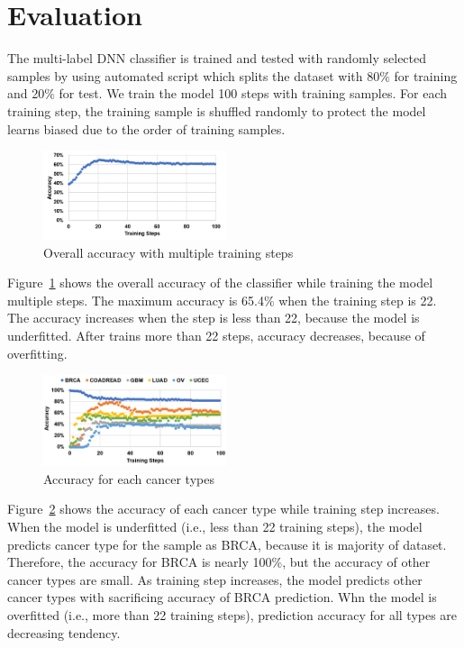 \section{Evaluation}

The multi-label DNN classifier is trained and tested with randomly selected samples by using automated script which splits the dataset with 80\% for training and 20\% for test. We train the model 100 steps with training samples. For each training step, the training sample is shuffled randomly to protect the model learns biased due to the order of training samples.

\begin{figure}[t]
\includegraphics[width=0.48\textwidth]{figs/accuracy_dnn_model.png}
\caption{Overall accuracy with multiple training steps}
\label{fig:accuracy_dnn_model}
\end{figure}

Figure~\ref{fig:accuracy_dnn_model} shows the overall accuracy of the classifier while training the model multiple steps. The maximum accuracy is 65.4\% when the training step is 22. The accuracy increases when the step is less than 22, because the model is underfitted. After trains more than 22 steps, accuracy decreases, because of overfitting.

\begin{figure}[t]
\includegraphics[width=0.48\textwidth]{figs/accuracy_dnn_cancer.png}
\caption{Accuracy for each cancer types}
\label{fig:accuracy_dnn_cancer}
\end{figure}

Figure~\ref{fig:accuracy_dnn_cancer} shows the accuracy of each cancer type while training step increases. When the model is underfitted (i.e., less than 22 training steps), the model predicts cancer type for the sample as BRCA, because it is majority of dataset. Therefore, the accuracy for BRCA is nearly 100\%, but the accuracy of other cancer types are small. As training step increases, the model predicts other cancer types with sacrificing accuracy of BRCA prediction. Whn the model is overfitted (i.e., more than 22 training steps), prediction accuracy for all types are decreasing tendency.
